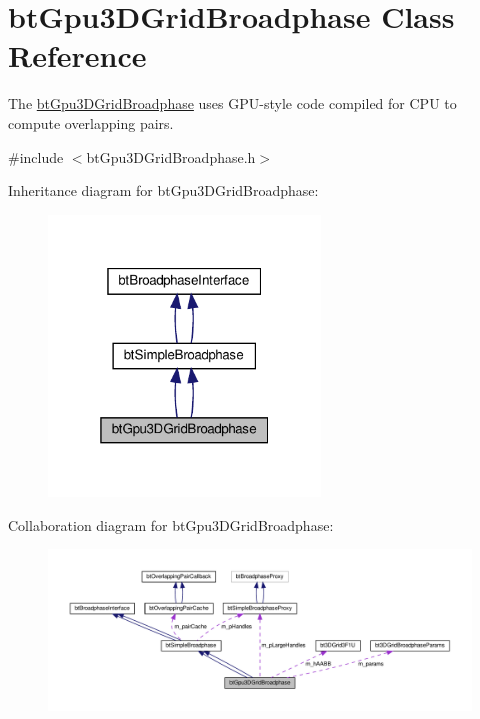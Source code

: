 \hypertarget{classbtGpu3DGridBroadphase}{}\section{bt\+Gpu3\+D\+Grid\+Broadphase Class Reference}
\label{classbtGpu3DGridBroadphase}


The \hyperlink{classbtGpu3DGridBroadphase}{bt\+Gpu3\+D\+Grid\+Broadphase} uses G\+P\+U-\/style code compiled for C\+PU to compute overlapping pairs.  




{\ttfamily \#include $<$bt\+Gpu3\+D\+Grid\+Broadphase.\+h$>$}



Inheritance diagram for bt\+Gpu3\+D\+Grid\+Broadphase\+:
\nopagebreak
\begin{figure}[H]
\begin{center}
\leavevmode
\includegraphics[width=205pt]{classbtGpu3DGridBroadphase__inherit__graph}
\end{center}
\end{figure}


Collaboration diagram for bt\+Gpu3\+D\+Grid\+Broadphase\+:
\nopagebreak
\begin{figure}[H]
\begin{center}
\leavevmode
\includegraphics[width=350pt]{classbtGpu3DGridBroadphase__coll__graph}
\end{center}
\end{figure}
